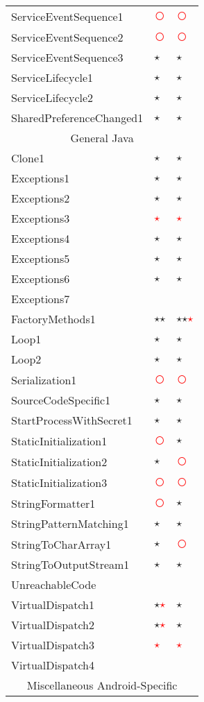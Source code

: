 \documentclass[../draft.tex]{subfiles}
\newcommand{\fp}{\textcolor{white}{\textcircled{\textcolor{red}{$\star$}}}}
\newcommand{\fn}{\textcolor{red}{\textcircled{ }}}
\newcommand{\tp}[0]{\textcircled{$\star$}}
\newcommand{\tsub}[1]{\multicolumn{3}{c}{#1}\\\hline}
\begin{document}
\begin{longtable}{l | l | l}
        ServiceEventSequence1 & \fn & \fn\\
        ServiceEventSequence2 & \fn & \fn\\
        ServiceEventSequence3 & \tp & \tp\\
        ServiceLifecycle1 & \tp & \tp\\
        ServiceLifecycle2 & \tp & \tp\\
        SharedPreferenceChanged1 & \tp & \tp\\
        \hline
        \tsub{General Java}
        Clone1 & \tp & \tp\\
        Exceptions1 & \tp & \tp \\
        Exceptions2 & \tp & \tp\\
        Exceptions3 & \fp & \fp \\
        Exceptions4 & \tp & \tp \\
        Exceptions5 & \tp & \tp \\
        Exceptions6 & \tp & \tp\\
        Exceptions7 & &\\
        FactoryMethods1 & \tp \tp & \tp \tp \fp\\
        Loop1 & \tp & \tp\\
        Loop2 & \tp & \tp\\
        Serialization1 & \fn & \fn\\
        SourceCodeSpecific1 & \tp & \tp\\
        StartProcessWithSecret1 & \tp & \tp\\
        StaticInitialization1 & \fn & \tp\\
        StaticInitialization2 & \tp & \fn\\
        StaticInitialization3 & \fn & \fn\\
        StringFormatter1 & \fn & \tp\\
        StringPatternMatching1 & \tp & \tp\\
        StringToCharArray1 & \tp & \fn\\
        StringToOutputStream1 & \tp & \tp\\
        UnreachableCode & &\\
        VirtualDispatch1 & \tp \fp & \tp\\
        VirtualDispatch2 & \tp \fp & \tp\\
        VirtualDispatch3 & \fp & \fp\\
        VirtualDispatch4 & &\\
        \hline
        \tsub{Miscellaneous Android-Specific}

\end{longtable}
\end{document}
